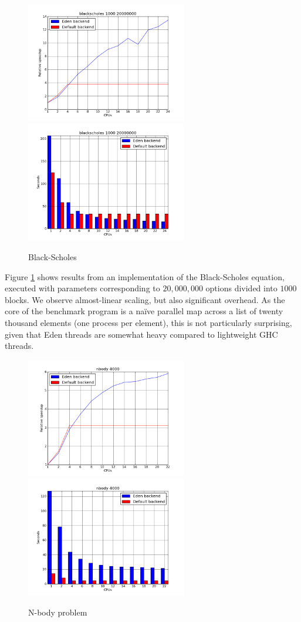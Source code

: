 \documentclass[a4paper, oneside, final]{memoir}
\begin{document}
\begin{figure}
\caption{Black-Scholes}
\label{fig:blackscholes}
\includegraphics[width=7cm]{blackscholes-speedup.png}
\includegraphics[width=7cm]{blackscholes-runtimes.png}
\end{figure}

Figure \ref{fig:blackscholes} shows results from an implementation of
the Black-Scholes equation, executed with parameters corresponding to
$20,000,000$ options divided into $1000$ blocks.  We observe
almost-linear scaling, but also significant overhead.  As the core of
the benchmark program is a naïve parallel map across a list of twenty
thousand elements (one process per element), this is not particularly
surprising, given that Eden threads are somewhat heavy compared to
lightweight GHC threads.

\begin{figure}
\caption{N-body problem}
\label{fig:nbody}
\includegraphics[width=7cm]{nbody-speedup.png}
\includegraphics[width=7cm]{nbody-runtimes.png}
\end{figure}
\end{document}
